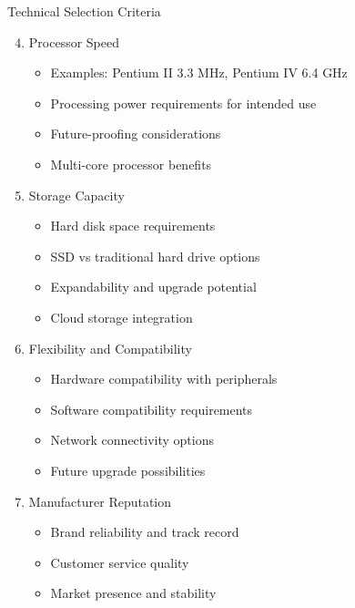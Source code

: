 \documentclass[aspectratio=169]{beamer}
\begin{document}
\begin{frame}{Technical Selection Criteria}
    \begin{enumerate}
        \setcounter{enumi}{3}
        \item Processor Speed
        \begin{itemize}
            \item Examples: Pentium II 3.3 MHz, Pentium IV 6.4 GHz
            \item Processing power requirements for intended use
            \item Future-proofing considerations
            \item Multi-core processor benefits
        \end{itemize}
        
        \item Storage Capacity
        \begin{itemize}
            \item Hard disk space requirements
            \item SSD vs traditional hard drive options
            \item Expandability and upgrade potential
            \item Cloud storage integration
        \end{itemize}
        
        \item Flexibility and Compatibility
        \begin{itemize}
            \item Hardware compatibility with peripherals
            \item Software compatibility requirements
            \item Network connectivity options
            \item Future upgrade possibilities
        \end{itemize}
        
        \item Manufacturer Reputation
        \begin{itemize}
            \item Brand reliability and track record
            \item Customer service quality
            \item Market presence and stability
        \end{itemize}
    \end{enumerate}
\end{frame}
\end{document}
